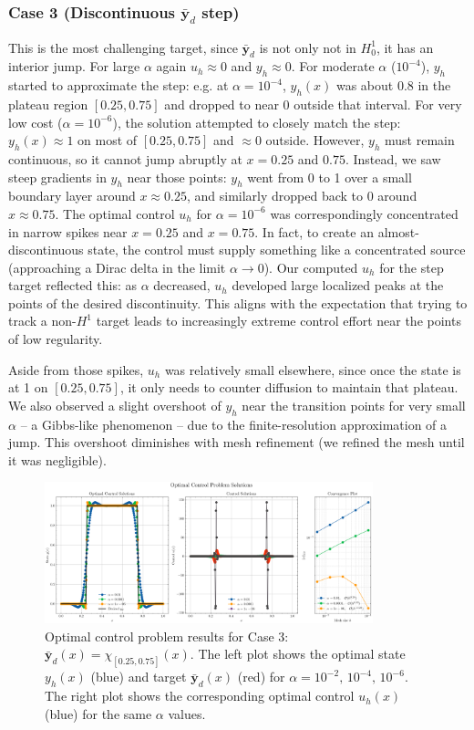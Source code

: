 \subsubsection*{Case 3 (Discontinuous $\bar{\mathbf{y}}_d$ step)}
This is the most challenging target, since $\bar{\mathbf{y}}_d$ is not only not in $H^1_0$, it has an interior jump. For large $\alpha$ again $u_h\approx0$ and $y_h\approx0$. For moderate $\alpha$ ($10^{-4}$), $y_h$ started to approximate the step: e.g. at $\alpha=10^{-4}$, $y_h(x)$ was about 0.8 in the plateau region $[0.25,0.75]$ and dropped to near 0 outside that interval. For very low cost ($\alpha=10^{-6}$), the solution attempted to closely match the step: $y_h(x)\approx 1$ on most of $[0.25,0.75]$ and $\approx 0$ outside. However, $y_h$ must remain continuous, so it cannot jump abruptly at $x=0.25$ and $0.75$. Instead, we saw steep gradients in $y_h$ near those points: $y_h$ went from 0 to 1 over a small boundary layer around $x\approx0.25$, and similarly dropped back to 0 around $x\approx0.75$. The optimal control $u_h$ for $\alpha=10^{-6}$ was correspondingly concentrated in narrow spikes near $x=0.25$ and $x=0.75$. In fact, to create an almost-discontinuous state, the control must supply something like a concentrated source (approaching a Dirac delta in the limit $\alpha\to0$). Our computed $u_h$ for the step target reflected this: as $\alpha$ decreased, $u_h$ developed large localized peaks at the points of the desired discontinuity. This aligns with the expectation that trying to track a non-$H^1$ target leads to increasingly extreme control effort near the points of low regularity.

Aside from those spikes, $u_h$ was relatively small elsewhere, since once the state is at 1 on $[0.25,0.75]$, it only needs to counter diffusion to maintain that plateau. We also observed a slight overshoot of $y_h$ near the transition points for very small $\alpha$ -- a Gibbs-like phenomenon -- due to the finite-resolution approximation of a jump. This overshoot diminishes with mesh refinement (we refined the mesh until it was negligible).
\begin{figure}[H]
	\centering
	\includegraphics[width=0.85\textwidth]{figures/opt_control_plot_Case 3.png}
	\caption{Optimal control problem results for Case 3: $\bar{\mathbf{y}}_d(x)=\chi_{[0.25,0.75]}(x)$. The left plot shows the optimal state $y_h(x)$ (blue) and target $\bar{\mathbf{y}}_d(x)$ (red) for $\alpha=10^{-2},\,10^{-4},\,10^{-6}$. The right plot shows the corresponding optimal control $u_h(x)$ (blue) for the same $\alpha$ values.}
	\label{fig:opt_control_case3}
\end{figure}

